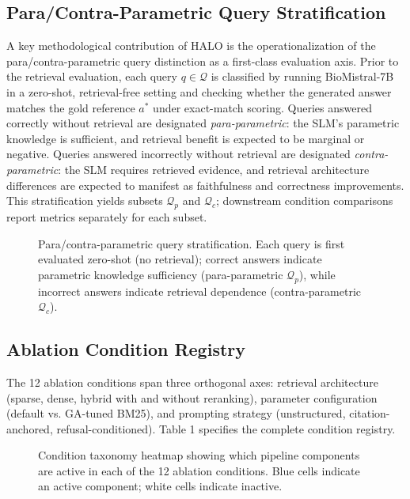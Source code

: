 \documentclass{article}
\begin{document}
\subsection{Para/Contra-Parametric Query Stratification}

\label{sec:para_contra_parametric_query_stratificat}

A key methodological contribution of HALO is the operationalization of the para/contra-parametric query distinction as a first-class evaluation axis. Prior to the retrieval evaluation, each query $q \in \mathcal{Q}$ is classified by running BioMistral-7B in a zero-shot, retrieval-free setting and checking whether the generated answer matches the gold reference $a^*$ under exact-match scoring. Queries answered correctly without retrieval are designated \textit{para-parametric}: the SLM's parametric knowledge is sufficient, and retrieval benefit is expected to be marginal or negative. Queries answered incorrectly without retrieval are designated \textit{contra-parametric}: the SLM requires retrieved evidence, and retrieval architecture differences are expected to manifest as faithfulness and correctness improvements. This stratification yields subsets $\mathcal{Q}_p$ and $\mathcal{Q}_c$; downstream condition comparisons report metrics separately for each subset.

\begin{figure}[t]
\centering

\caption{Para/contra-parametric query stratification. Each query is first evaluated zero-shot (no retrieval); correct answers indicate parametric knowledge sufficiency (para-parametric $\mathcal{Q}_p$), while incorrect answers indicate retrieval dependence (contra-parametric $\mathcal{Q}_c$).}
\label{fig:stratification}
\end{figure}

\subsection{Ablation Condition Registry}

\label{sec:ablation_condition_registry}

The 12 ablation conditions span three orthogonal axes: retrieval architecture (sparse, dense, hybrid with and without reranking), parameter configuration (default vs. GA-tuned BM25), and prompting strategy (unstructured, citation-anchored, refusal-conditioned). Table 1 specifies the complete condition registry.

\begin{figure}[t]
\centering

\caption{Condition taxonomy heatmap showing which pipeline components are active in each of the 12 ablation conditions. Blue cells indicate an active component; white cells indicate inactive.}
\label{fig:condition_heatmap}
\end{figure}
\end{document}
